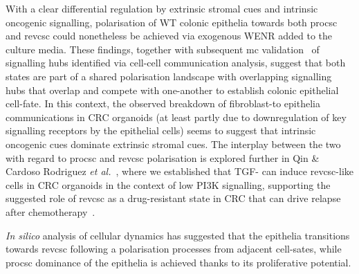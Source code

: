With a clear differential regulation by extrinsic stromal cues and intrinsic oncogenic signalling, polarisation of WT colonic epithelia towards both \acrshort{procsc} and \acrshort{revcsc} could nonetheless be achieved via exogenous WENR added to the culture media. These findings, together with subsequent \acrshort{mc} validation~\cite{cardoso_rodriguez_single-cell_2023} of signalling hubs identified via cell-cell communication analysis, suggest that both states are part of a shared polarisation landscape with overlapping signalling hubs that overlap and compete with one-another to establish colonic epithelial cell-fate.
In this context, the observed breakdown of fibroblast-to epithelia communications in CRC organoids (at least partly due to downregulation of key signalling receptors by the epithelial cells) seems to suggest that intrinsic oncogenic cues dominate extrinsic stromal cues. The interplay between the two with regard to \acrshort{procsc} and \acrshort{revcsc} polarisation is explored further in Qin \& Cardoso Rodriguez \emph{et al.}~\cite{cardoso_rodriguez_single-cell_2023}, where we established that TGF-\textbeta\hspace{0.1cm} can induce \acrshort{revcsc}-like cells in CRC organoids in the context of low PI3K signalling, supporting the suggested role of \acrshort{revcsc} as a drug-resistant state in CRC that can drive relapse after chemotherapy~\cite{alvarez-varela_mex3a_2022, zapatero_trellis_2023}.

\emph{In silico} analysis of cellular dynamics has suggested that the epithelia transitions towards \acrshort{revcsc} following a polarisation processes from adjacent cell-sates, while \acrshort{procsc} dominance of the epithelia is achieved thanks to its proliferative potential.

